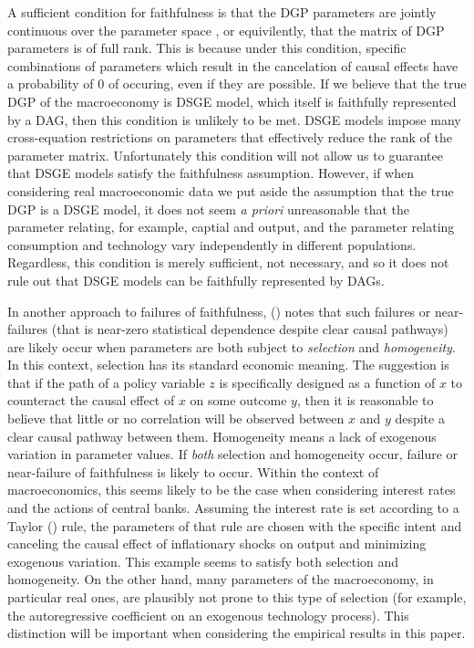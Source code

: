 \documentclass{article}
\begin{document}
A sufficient condition for faithfulness is that the DGP parameters are jointly continuous over the parameter space \parencite{steel2006homogeneity}, or equivilently, that the matrix of DGP parameters is of full rank. This is because under this condition, specific combinations of parameters which result in the cancelation of causal effects have a probability of 0 of occuring, even if they are possible. If we believe that the true DGP of the macroeconomy is DSGE model, which itself is faithfully represented by a DAG, then this condition is unlikely to be met. DSGE models impose many cross-equation restrictions on parameters that effectively reduce the rank of the parameter matrix. Unfortunately this condition will not allow us to guarantee that DSGE models satisfy the faithfulness assumption. However, if when considering real macroeconomic data we put aside the assumption that the true DGP is a DSGE model, it does not seem \textit{a priori} unreasonable that the parameter relating, for example, captial and output, and the parameter relating consumption and technology vary independently in different populations. Regardless, this condition is merely sufficient, not necessary, and so it does not rule out that DSGE models can be faithfully represented by DAGs. 

In another approach to failures of faithfulness, \citeauthor{steel2006homogeneity} (\citeyear{steel2006homogeneity}) notes that such failures or near-failures (that is near-zero statistical dependence despite clear causal pathways) are likely occur when parameters are both subject to \textit{selection} and \textit{homogeneity}. In this context, selection has its standard economic meaning. The suggestion is that if the path of a policy variable $z$ is specifically designed as a function of $x$ to counteract the causal effect of $x$ on some outcome $y$, then it is reasonable to believe that little or no correlation will be observed between $x$ and $y$ despite a clear causal pathway between them. Homogeneity means a lack of exogenous variation in parameter values. If \textit{both} selection and homogeneity occur, failure or near-failure of faithfulness is likely to occur. Within the context of macroeconomics, this seems likely to be the case when considering interest rates and the actions of central banks. Assuming the interest rate is set according to a Taylor (\citeyear{taylor1993discretion}) rule, the parameters of that rule are chosen with the specific intent and canceling the causal effect of inflationary shocks on output and minimizing exogenous variation. This example seems to satisfy both selection and homogeneity. On the other hand, many parameters of the macroeconomy, in particular real ones, are plausibly not prone to this type of selection (for example, the autoregressive coefficient on an exogenous technology process). This distinction will be important when considering the empirical results in this paper.
\end{document}
